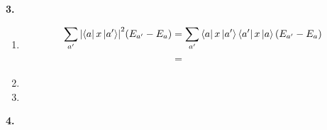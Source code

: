 \documentclass{article}
\theoremstyle{definition}
\begin{document}
\noindent \textbf{3. }

\begin{enumerate}[label=(\alph*)]
	\item 
	\begin{align*}
	\sum_{a'}\abs{\bra{a}x\ket{a'}}^2 (E_{a'} - E_a) 
	&= \sum_{a'}\bra{a}x \ket{a'}\bra{a'}x \ket{a} (E_{a'} - E_a) \\
	&= 
	\end{align*}
	
	\item 
	
	
	\item 
\end{enumerate}

\noindent \textbf{4. }


	
\end{document}

